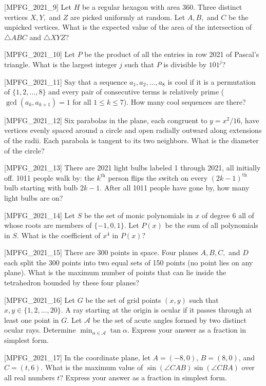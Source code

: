 [MPFG_2021_9]
Let $H$ be a regular hexagon with area 360. Three distinct vertices $X, Y,$ and $Z$ are picked uniformly at random. Let $A, B,$ and $C$ be the unpicked vertices. What is the expected value of the area of the intersection of $\triangle ABC$ and $\triangle XYZ$?

[MPFG_2021_10]
Let $P$ be the product of all the entries in row 2021 of Pascal's triangle. What is the largest integer $j$ such that $P$ is divisible by $101^j$?

[MPFG_2021_11]
Say that a sequence $a_1, a_2, \dots, a_8$ is cool if it is a permutation of $\{1, 2, \dots, 8\}$ and every pair of consecutive terms is relatively prime ($\gcd(a_k, a_{k+1})=1$ for all $1 \le k \le 7$). How many cool sequences are there?

[MPFG_2021_12]
Six parabolas in the plane, each congruent to $y = x^2/16$, have vertices evenly spaced around a circle and open radially outward along extensions of the radii. Each parabola is tangent to its two neighbors. What is the diameter of the circle?

[MPFG_2021_13]
There are 2021 light bulbs labeled 1 through 2021, all initially off. 1011 people walk by: the $k^{\text{th}}$ person flips the switch on every $(2k-1)^{\text{th}}$ bulb starting with bulb $2k-1$. After all 1011 people have gone by, how many light bulbs are on?

[MPFG_2021_14]
Let $S$ be the set of monic polynomials in $x$ of degree 6 all of whose roots are members of $\{-1, 0, 1\}$. Let $P(x)$ be the sum of all polynomials in $S$. What is the coefficient of $x^4$ in $P(x)$?

[MPFG_2021_15]
There are 300 points in space. Four planes $A, B, C,$ and $D$ each split the 300 points into two equal sets of 150 points (no point lies on any plane). What is the maximum number of points that can lie inside the tetrahedron bounded by these four planes?

[MPFG_2021_16]
Let $G$ be the set of grid points $(x, y)$ such that $x, y \in \{1, 2, \dots, 20\}$. A ray starting at the origin is ocular if it passes through at least one point in $G$. Let $\mathcal{A}$ be the set of acute angles formed by two distinct ocular rays. Determine $\min_{\alpha \in \mathcal{A}} \tan\alpha$. Express your answer as a fraction in simplest form.

[MPFG_2021_17]
In the coordinate plane, let $A=(-8,0)$, $B=(8,0)$, and $C=(t,6)$. What is the maximum value of $\sin(\angle CAB)\sin(\angle CBA)$ over all real numbers $t$? Express your answer as a fraction in simplest form.

